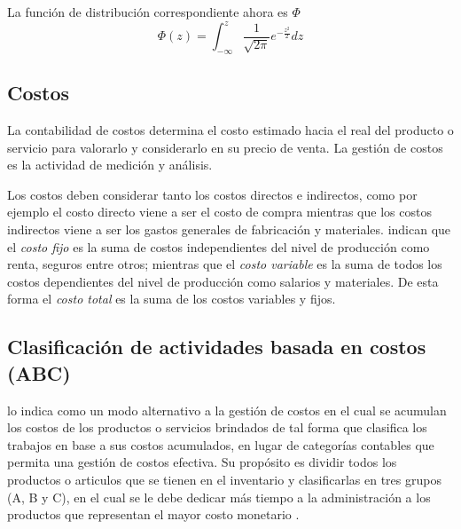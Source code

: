 La función de distribución correspondiente ahora es $\Phi$
\begin{equation}
	\Phi (z) = \int_{-\infty}^{z} \frac{1}{\sqrt{2 \pi}} {e}^{- \frac{{z}^{2}}{2}} dz
\end{equation}

\subsection{Costos}
La contabilidad de costos determina el costo estimado hacia el real del producto o servicio para valorarlo y considerarlo en su precio de venta. La gestión de costos es la actividad de medición y análisis. \citep{toomey2000inventory}

Los costos deben considerar tanto los costos directos e indirectos, como por ejemplo el costo directo viene a ser el costo de compra mientras que los costos indirectos viene a ser los gastos generales de fabricación y materiales. \cite{haeussler2003matematicas} indican que el \textsl{costo fijo} es la suma de costos independientes del nivel de producción como renta, seguros entre otros; mientras que el \textsl{costo variable} es la suma de todos los costos dependientes del nivel de producción como salarios y materiales. De esta forma el \textsl{costo total} es la suma de los costos variables y fijos.

\newpage
\subsection{Clasificación de actividades basada en costos (ABC)}
\label{section:ABC}
\cite{toomey2000inventory} lo indica como un modo alternativo a la gestión de costos en el cual se acumulan los costos de los productos o servicios brindados de tal forma que clasifica los trabajos en base a sus costos acumulados, en lugar de categorías contables que permita una gestión de costos efectiva. Su propósito es dividir todos los productos o articulos que se tienen en el inventario y clasificarlas en tres grupos (A, B y C), en el cual se le debe dedicar más tiempo a la administración a los productos que representan el mayor costo monetario \citep{render2006metodos}.

